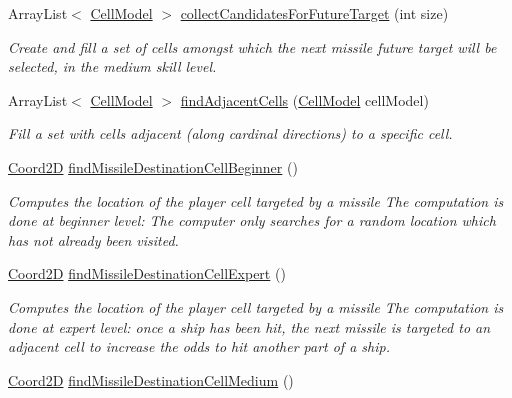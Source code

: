\begin{DoxyCompactItemize}
\item 
Array\-List$<$ \hyperlink{classbattleship2D_1_1model_1_1CellModel}{Cell\-Model} $>$ \hyperlink{classbattleship2D_1_1ui_1_1BoardUIComputer_a051698ce5b45371a4e3d5f53177df6e8}{collect\-Candidates\-For\-Future\-Target} (int size)
\begin{DoxyCompactList}\small\item\em Create and fill a set of cells amongst which the next missile future target will be selected, in the medium skill level. \end{DoxyCompactList}\item 
Array\-List$<$ \hyperlink{classbattleship2D_1_1model_1_1CellModel}{Cell\-Model} $>$ \hyperlink{classbattleship2D_1_1ui_1_1BoardUIComputer_a884ba29c155fc322f4235b93276f2a23}{find\-Adjacent\-Cells} (\hyperlink{classbattleship2D_1_1model_1_1CellModel}{Cell\-Model} cell\-Model)
\begin{DoxyCompactList}\small\item\em Fill a set with cells adjacent (along cardinal directions) to a specific cell. \end{DoxyCompactList}\item 
\hyperlink{classbattleship2D_1_1model_1_1Coord2D}{Coord2\-D} \hyperlink{classbattleship2D_1_1ui_1_1BoardUIComputer_a2ee5a1022a4e4f7c017c730e43e0a5ea}{find\-Missile\-Destination\-Cell\-Beginner} ()
\begin{DoxyCompactList}\small\item\em Computes the location of the player cell targeted by a missile The computation is done at beginner level\-: The computer only searches for a random location which has not already been visited. \end{DoxyCompactList}\item 
\hyperlink{classbattleship2D_1_1model_1_1Coord2D}{Coord2\-D} \hyperlink{classbattleship2D_1_1ui_1_1BoardUIComputer_a2291bd3adb54e7414eb484d28fdec820}{find\-Missile\-Destination\-Cell\-Expert} ()
\begin{DoxyCompactList}\small\item\em Computes the location of the player cell targeted by a missile The computation is done at expert level\-: once a ship has been hit, the next missile is targeted to an adjacent cell to increase the odds to hit another part of a ship. \end{DoxyCompactList}\item 
\hyperlink{classbattleship2D_1_1model_1_1Coord2D}{Coord2\-D} \hyperlink{classbattleship2D_1_1ui_1_1BoardUIComputer_abc8377b572ab0b53866609189e9c81a5}{find\-Missile\-Destination\-Cell\-Medium} ()

\end{DoxyCompactItemize}

